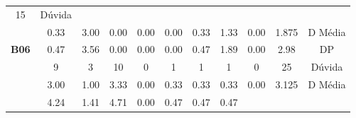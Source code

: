 \begin{table}[htbp]
\begin{tabular}{|ccccccccccc|}
		\multicolumn{1}{c|}{15} &
		Dúvida \\ \cline{2-11} 
		\rowcolor[HTML]{D9D9D9} 
		\multicolumn{1}{|c|}{\cellcolor[HTML]{F2F2F2}} &
		\multicolumn{1}{c|}{\cellcolor[HTML]{D9D9D9}0.33} &
		\multicolumn{1}{c|}{\cellcolor[HTML]{D9D9D9}3.00} &
		\multicolumn{1}{c|}{\cellcolor[HTML]{D9D9D9}0.00} &
		\multicolumn{1}{c|}{\cellcolor[HTML]{D9D9D9}0.00} &
		\multicolumn{1}{c|}{\cellcolor[HTML]{D9D9D9}0.00} &
		\multicolumn{1}{c|}{\cellcolor[HTML]{D9D9D9}0.33} &
		\multicolumn{1}{c|}{\cellcolor[HTML]{D9D9D9}1.33} &
		\multicolumn{1}{c|}{\cellcolor[HTML]{D9D9D9}0.00} &
		\multicolumn{1}{c|}{\cellcolor[HTML]{D9D9D9}1.875} &
		D Média \\ \cline{2-11} 
		\multicolumn{1}{|c|}{\multirow{-3}{*}{\cellcolor[HTML]{F2F2F2}\textbf{B06}}} &
		\multicolumn{1}{c|}{0.47} &
		\multicolumn{1}{c|}{3.56} &
		\multicolumn{1}{c|}{0.00} &
		\multicolumn{1}{c|}{0.00} &
		\multicolumn{1}{c|}{0.00} &
		\multicolumn{1}{c|}{0.47} &
		\multicolumn{1}{c|}{1.89} &
		\multicolumn{1}{c|}{0.00} &
		\multicolumn{1}{c|}{2.98} &
		DP \\ \hline
		\rowcolor[HTML]{D9D9D9} 
		\multicolumn{1}{|c|}{\cellcolor[HTML]{F2F2F2}} &
		\multicolumn{1}{c|}{\cellcolor[HTML]{D9D9D9}9} &
		\multicolumn{1}{c|}{\cellcolor[HTML]{D9D9D9}3} &
		\multicolumn{1}{c|}{\cellcolor[HTML]{D9D9D9}10} &
		\multicolumn{1}{c|}{\cellcolor[HTML]{D9D9D9}0} &
		\multicolumn{1}{c|}{\cellcolor[HTML]{D9D9D9}1} &
		\multicolumn{1}{c|}{\cellcolor[HTML]{D9D9D9}1} &
		\multicolumn{1}{c|}{\cellcolor[HTML]{D9D9D9}1} &
		\multicolumn{1}{c|}{\cellcolor[HTML]{D9D9D9}0} &
		\multicolumn{1}{c|}{\cellcolor[HTML]{D9D9D9}25} &
		Dúvida \\ \cline{2-11} 
		\multicolumn{1}{|c|}{\cellcolor[HTML]{F2F2F2}} &
		\multicolumn{1}{c|}{3.00} &
		\multicolumn{1}{c|}{1.00} &
		\multicolumn{1}{c|}{3.33} &
		\multicolumn{1}{c|}{0.00} &
		\multicolumn{1}{c|}{0.33} &
		\multicolumn{1}{c|}{0.33} &
		\multicolumn{1}{c|}{0.33} &
		\multicolumn{1}{c|}{0.00} &
		\multicolumn{1}{c|}{3.125} &
		D Média \\ \cline{2-11} 
		\rowcolor[HTML]{D9D9D9} 
		\multicolumn{1}{|c|}{\multirow{-3}{*}{\cellcolor[HTML]{F2F2F2}\textbf{B08}}} &
		\multicolumn{1}{c|}{\cellcolor[HTML]{D9D9D9}4.24} &
		\multicolumn{1}{c|}{\cellcolor[HTML]{D9D9D9}1.41} &
		\multicolumn{1}{c|}{\cellcolor[HTML]{D9D9D9}4.71} &
		\multicolumn{1}{c|}{\cellcolor[HTML]{D9D9D9}0.00} &
		\multicolumn{1}{c|}{\cellcolor[HTML]{D9D9D9}0.47} &
		\multicolumn{1}{c|}{\cellcolor[HTML]{D9D9D9}0.47} &
		\multicolumn{1}{c|}{\cellcolor[HTML]{D9D9D9}0.47} &

\end{tabular}
\end{table}
